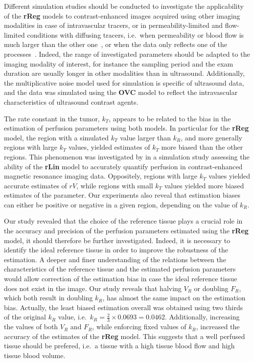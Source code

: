 Different simulation studies should be conducted to investigate the applicability of the \textbf{rReg} models to contrast-enhanced images acquired using other imaging modalities in case of intravascular tracers, or in permeability-limited and flow-limited conditions with diffusing tracers, i.e.~when permeability or blood flow is much larger than the other one~\cite{Tofts:1999ih}, or when the data only reflects one of the processes~\cite{Balvay:2005ca}. 
Indeed, the range of investigated parameters should be adapted to the imaging modality of interest, for instance the sampling period and the exam duration are usually longer in other modalities than in ultrasound.
Additionally, the multiplicative noise model used for simulation is specific of ultrasound data, and the data was simulated using the \textbf{OVC} model to reflect the intravascular characteristics of ultrasound contrast agents. 

The rate constant in the tumor, $k_T$, appears to be related to the bias in the estimation of perfusion parameters using both models.
In particular for the \textbf{rReg} model, the region with a simulated $k_T$ value larger than $k_R$, and more generally regions with large $k_T$ values, yielded estimates of $k_T$ more biased than the other regions.
This phenomenon was investigated by \citet{CardenasRodriguez:2013em} in a simulation study assessing the ability of the \textbf{rLin} model to accurately quantify perfusion in contrast-enhanced magnetic resonance imaging data.
Oppositely, regions with large $k_T$ values yielded accurate estimates of $rV$, while regions with small $k_T$ values yielded more biased estimates of the parameter.
Our experiments also reveal that estimation biases can either be positive or negative in a given region, depending on the value of $k_R$.

Our study revealed that the choice of the reference tissue plays a crucial role in the accuracy and precision of the perfusion parameters estimated using the \textbf{rReg} model, it should therefore be further investigated.
Indeed, it is necessary to identify the ideal reference tissue in order to improve the robustness of the estimation.
A deeper and finer understanding of the relations between the characteristics of the reference tissue and the estimated perfusion parameters would allow correction of the estimation bias in case the ideal reference tissue does not exist in the image.
Our study reveals that halving $V_R$ or doubling $F_R$, which both result in doubling $k_R$, has almost the same impact on the estimation bias.
Actually, the least biased estimation overall was obtained using two thirds of the original $k_R$ value, i.e.~$k_R = \frac{2}{3} \times 0.0693 = 0.0462$.
Additionally, increasing the values of both $V_R$ and $F_R$, while enforcing fixed values of $k_R$, increased the accuracy of the estimates of the \textbf{rReg} model.
This suggests that a well perfused tissue should be prefered, i.e.~a tissue with a high tissue blood flow and high tissue blood volume.


